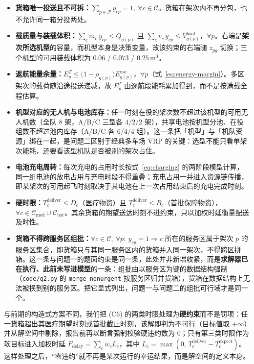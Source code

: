 \begin{itemize}
	\item[(C1)] \textbf{货箱唯一投送且不可拆：}$\sum_{p\in\mathcal{P}} y_{cp}=1,\ \forall c\in\mathcal{C}$。货箱在架次内不再分包，也不允许同一箱分投两处。
	\item[(C2)] \textbf{载质量与装载体积：}$\sum_{c}m_c\,y_{cp}\le Q_{g(p)}$ 且 $\sum_{c}v_c\,y_{cp}\le V^{\mathrm{load}}_{g(p)}$，$\forall p$。右端是\textbf{架次所选机型}的容量，而机型本身是决策变量，故该约束的右端随 $z_{pg}$ 切换；三个机型的可用装载体积为 $0.06$ / $0.073$ / $0.25$\,m$^3$。
	\item[(C3)] \textbf{返航能量余量：}$E^{T}_p\le\bigl(1-\rho_{g(p)}\bigr)E^{\mathrm{use}}_{g(p)}$，$\forall p$（式~\eqref{eq:energy-margin}）。多区架次的载荷随沿途投送递减，故 $E^{T}_p$ 由逐航段能耗累加得到，而不是按满载全程估算。
	\item[(C4)] \textbf{机型对应的无人机与电池库存：}任一时刻在役的架次数不超过该机型的可用无人机数（全队 8 架，A/B/C 三型各 $4/2/2$ 架），共享电池按机型分池、在役组数不超过池内库存（A/B/C 各 $6/4/4$ 组）。这一条把「机型」与「机队资源」绑在一起，是问题二区别于经典多车场 VRP 的关键：选型不能只看单架次能耗，还要看该型机队是否被别的架次占住。
	\item[(C5)] \textbf{电池充电周转：}每次充电的占用时长按式~\eqref{eq:charging} 的两阶段模型计算，同一组电池的放电占用与充电时段不得重叠；充电占用一并进入资源链传播，即某架次的可用起飞时刻取决于其电池在上一次占用结束后的充电完成时刻。
	\item[(C6)] \textbf{硬时限：}$T^{\mathrm{deliver}}_c\le D_c$（医疗物资）且 $T^{\mathrm{deliver}}_c\le B_c$（首批保障物资），$\forall c\in\mathcal{C}_{\mathrm{med}}\cup\mathcal{C}_{\mathrm{bat}}$。其余货箱的期望送达时刻不进约束，只以加权时延衡量配送及时性。
	\item[(C7)] \textbf{货箱不得跨服务区组批：}$\forall c\in\mathcal{C},\ \forall p:\ y_{cp}=1 \Rightarrow c$ 所在的服务区属于架次 $p$ 的服务区集合，即货箱只与其同一服务区内的货箱并入同一架次，不得跨区拼箱。这一条与问题一的题面约束是同一条，此处并非新增收紧，而是\textbf{求解器已在执行、此前未写进模型}的一条：组批由以服务区为键的数据结构强制（\texttt{code/q2.py} 的 \texttt{merge\_nonurgent} 按服务区归并货箱），货箱在数据结构上无法被换到别的服务区。把它显式列出，问题一与问题二的组批可行域才是同一个。
\end{itemize}

与前期的构造式方案不同，我们把 (C6) 的两类时限处理为\textbf{硬约束}而不是罚项：任一货箱超出其医疗期望时刻或首批截止时刻，该解即判为不可行（目标值取 $+\infty$）并从解空间中剔除，报告前再以断言强制校验硬违约数为 0；只有第三类时限作为软目标进入加权时延 $F_{\mathrm{delay}}=\sum_c w_c L_c$，其中 $L_c=\max(0,\,T_c^{\mathrm{deliver}}-T_c^{\mathrm{expect}})$。这样处理之后，“零违约”就不再是某次运行的幸运结果，而是解空间的定义本身。

